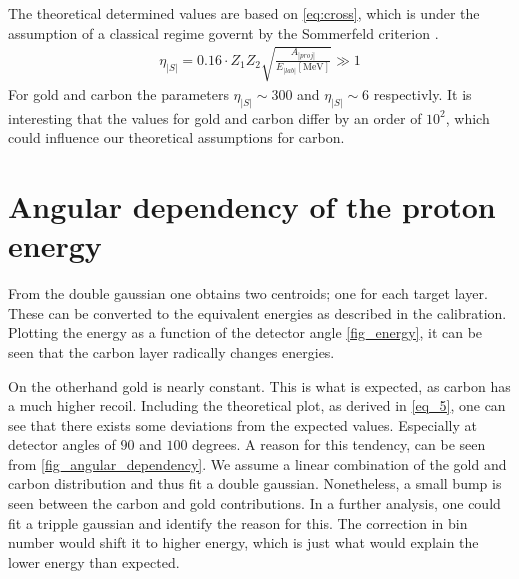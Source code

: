 The theoretical determined values are based on \cref{eq:cross}, which is under the assumption of a classical regime governt by the Sommerfeld criterion \parencite[p. 14]{noteBB}.
\begin{align}\label{eq:som}
\eta_|S|=0.16\cdot Z_1Z_2\sqrt{\frac{A_|proj|}{E_|lab|[\si{\mega\electronvolt}]}}\gg 1
\end{align}
For gold and carbon the parameters $\eta_|S|\sim 300$ and
$\eta_|S|\sim 6$ respectivly. It is interesting that the values for gold and
carbon differ by an order of $10^2$, which could influence our theoretical
assumptions for carbon.

\section{Angular dependency of the proton energy}
From the double gaussian one obtains two centroids; one for each target layer.
These can be converted to the equivalent energies as described in the
calibration. Plotting the energy as a function of the detector angle
\cref{fig_energy}, it can be seen that the carbon layer radically changes
energies.

On the otherhand gold is nearly constant. This is what is expected, as carbon
has a much higher recoil. Including the theoretical plot, as derived in
\cref{eq_5}, one can see that there exists some deviations from the expected
values. Especially at detector angles of $90$ and $100$ degrees.
A reason for this tendency, can be seen from \cref{fig_angular_dependency}. We
assume a linear combination of the gold and carbon distribution and thus fit a
double gaussian. Nonetheless, a small bump is seen between the carbon and gold
contributions. In a further analysis, one could fit a tripple gaussian and
identify the reason for this. The correction in bin number would shift it to
higher energy, which is just what would explain the lower energy than
expected.

